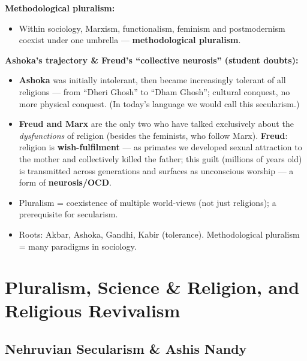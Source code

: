 \begin{KeyConcept}
\textbf{Methodological pluralism:}
\begin{itemize}
\item Within sociology, Marxism, functionalism, feminism and postmodernism coexist under one umbrella --- \textbf{methodological pluralism}.
\end{itemize}
\end{KeyConcept}

\begin{DataFact}
\textbf{Ashoka's trajectory \& Freud's ``collective neurosis'' (student doubts):}
\begin{itemize}
\item \textbf{Ashoka} was initially intolerant, then became increasingly tolerant of all religions --- from ``Dheri Ghosh'' to ``Dham Ghosh''; cultural conquest, no more physical conquest. (In today's language we would call this secularism.)
\item \textbf{Freud and Marx} are the only two who have talked exclusively about the \textit{dysfunctions} of religion (besides the feminists, who follow Marx). \textbf{Freud}: religion is \textbf{wish-fulfilment} --- as primates we developed sexual attraction to the mother and collectively killed the father; this guilt (millions of years old) is transmitted across generations and surfaces as unconscious worship --- a form of \textbf{neurosis/OCD}.
\end{itemize}
\end{DataFact}

\begin{QuickRevision}
\begin{itemize}
\item Pluralism = coexistence of multiple world-views (not just religions); a prerequisite for secularism.
\item Roots: Akbar, Ashoka, Gandhi, Kabir (tolerance). Methodological pluralism = many paradigms in sociology.
\end{itemize}
\end{QuickRevision}

\sectiondivider

\section{Pluralism, Science \& Religion, and Religious Revivalism}

\subsection{Nehruvian Secularism \& Ashis Nandy}

